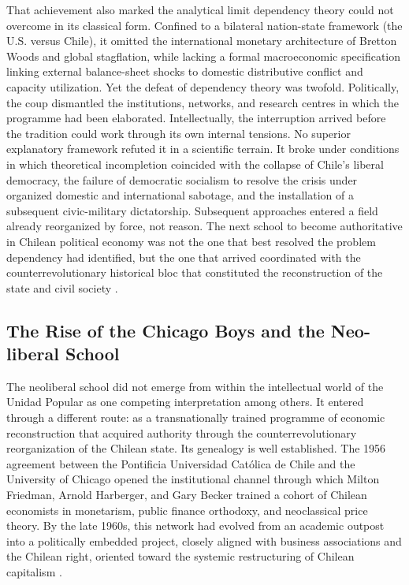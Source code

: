 That achievement also marked the analytical limit dependency theory could not overcome 
in its classical form. Confined to a bilateral nation-state framework (the U.S. versus Chile), it omitted 
the international monetary architecture of Bretton Woods and global stagflation, while lacking a formal 
macroeconomic specification linking external balance-sheet shocks to domestic distributive conflict and 
capacity utilization.  Yet the defeat of dependency theory was twofold. Politically, the coup dismantled the institutions, networks, and research centres in which the programme had been elaborated. Intellectually, the 
interruption arrived before the tradition could work through its own internal tensions. No superior 
explanatory framework refuted it in a scientific terrain. It broke under conditions in which theoretical incompletion coincided with the collapse of Chile's liberal democracy, the failure of democratic socialism to 
resolve the crisis under organized domestic and international sabotage, and the installation of a 
subsequent civic-military dictatorship. Subsequent approaches entered a field already reorganized 
by force, not reason. The next school to become authoritative in Chilean political economy was not 
the one that best resolved the problem dependency had identified, but the one that arrived coordinated 
with the counterrevolutionary historical bloc that constituted the reconstruction of the state and civil society \citep{Casals2021}.

\subsection{The Rise of the Chicago Boys and the Neo-liberal School}
\label{sec:A2_neoliberal_chicago}

The neoliberal school did not emerge from within the intellectual world of the Unidad 
Popular as one competing interpretation among others. It entered through a different route: as a 
transnationally trained programme of economic reconstruction that acquired authority through the 
counterrevolutionary reorganization of the Chilean state. Its genealogy is well established. The 1956 
agreement between the Pontificia Universidad Católica de Chile and the University of Chicago opened 
the institutional channel through which Milton Friedman, Arnold Harberger, and Gary Becker trained 
a cohort of Chilean economists in monetarism, public finance orthodoxy, and neoclassical price theory. 
By the late 1960s, this network had evolved from an academic outpost into a politically embedded 
project, closely aligned with business associations and the Chilean right, oriented toward the systemic 
restructuring of Chilean capitalism \citep{Valdes1995,Fischer2009,Clark2017}.

